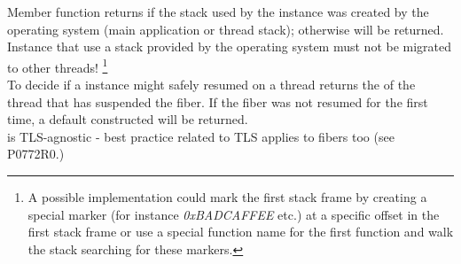 
Member function \usessysstack returns  if the stack used by the
\fiber instance was created by the operating system (main application or thread
stack); otherwise  will be returned. Instance that use a stack
provided by the operating system must not be migrated to other threads!
\footnote{A possible implementation could mark the first stack frame by creating
a special marker (for instance \emph{0xBADCAFFEE} etc.) at a specific offset
in the first stack frame or use a special function name for the first function 
and walk the stack searching for these markers.}\\

To decide if a \fiber instance might safely resumed on  a thread \prevtid
returns the  of the thread that has suspended the fiber. If
the fiber was not resumed for the first time, a default constructed
 will be returned.\\

\fiber is TLS-agnostic - best practice related to TLS applies to fibers too
(see P0772R0.)\\

%
%
%
